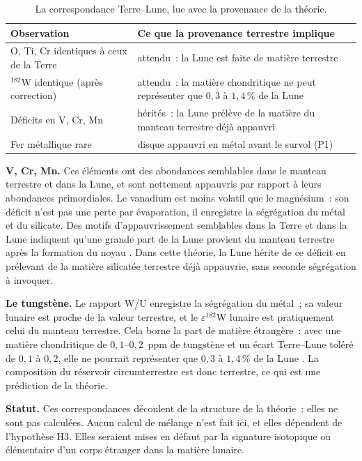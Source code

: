 \documentclass[11pt,a4paper]{article}
\begin{document}
\begin{table}[htbp]
\centering
\caption{La correspondance Terre--Lune, lue avec la provenance de la théorie.\label{tab:isotopes}}
\small
\begin{tabular}{>{\raggedright\arraybackslash}p{4.4cm}>{\raggedright\arraybackslash}p{10.4cm}}
\toprule
Observation & Ce que la provenance terrestre implique \\
\midrule
O, Ti, Cr identiques à ceux de la Terre & attendu~: la Lune est faite de matière terrestre \\
$^{182}$W identique (après correction) & attendu~: la matière chondritique ne peut représenter que $0{,}3$ à $1{,}4\,\%$ de la Lune \\
Déficits en V, Cr, Mn & hérités~: la Lune prélève de la matière du manteau terrestre déjà appauvri \\
Fer métallique rare & disque appauvri en métal avant le survol (P1) \\
\bottomrule
\end{tabular}
\end{table}

\textbf{V, Cr, Mn.} Ces éléments ont des abondances semblables dans le manteau terrestre et dans la Lune, et sont nettement appauvris par rapport à leurs abondances primordiales. Le vanadium est moins volatil que le magnésium~: son déficit n'est pas une perte par évaporation, il enregistre la ségrégation du métal et du silicate. Des motifs d'appauvrissement semblables dans la Terre et dans la Lune indiquent qu'une grande part de la Lune provient du manteau terrestre après la formation du noyau \citep{Drake1989,Ringwood1990,Gessmann2000}. Dans cette théorie, la Lune hérite de ce déficit en prélevant de la matière silicatée terrestre déjà appauvrie, sans seconde ségrégation à invoquer.

\textbf{Le tungstène.} Le rapport W/U enregistre la ségrégation du métal~; sa valeur lunaire est proche de la valeur terrestre, et le $\varepsilon^{182}$W lunaire est pratiquement celui du manteau terrestre. Cela borne la part de matière étrangère~: avec une matière chondritique de $0{,}1$--$0{,}2$~ppm de tungstène et un écart Terre--Lune toléré de $0{,}1$ à $0{,}2$, elle ne pourrait représenter que $0{,}3$ à $1{,}4\,\%$ de la Lune \citep{Debailleul2026a}. La composition du réservoir circumterrestre est donc terrestre, ce qui est une prédiction de la théorie.

\textbf{Statut.} Ces correspondances découlent de la structure de la théorie~; elles ne sont pas calculées. Aucun calcul de mélange n'est fait ici, et elles dépendent de l'hypothèse H3. Elles seraient mises en défaut par la signature isotopique ou élémentaire d'un corps étranger dans la matière lunaire.
\end{document}
